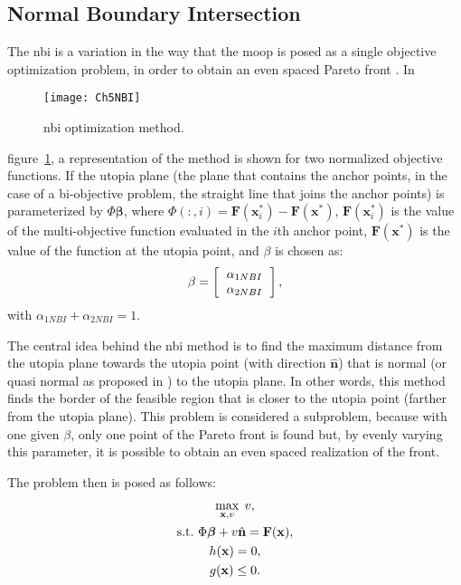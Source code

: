 \subsection{Normal Boundary Intersection}
\label{sec:NBI}
%
The \gls{nbi} is a variation in the way that the \gls{moop} is posed as a single objective optimization problem, in order to obtain an even spaced Pareto front \citep{Das1998}. In %
%
\begin{figure}[b]%
	\centering
	\texttt{[image: Ch5NBI]}%
	\caption{\gls{nbi} optimization method.}%
	\label{fig:NBI}%
\end{figure}
%
figure~\ref{fig:NBI}, a representation of the method is shown for two normalized objective functions. If the utopia plane (the plane that contains the anchor points, in the case of a bi-objective problem, the straight line that joins the anchor points) is parameterized by $\Phi\mathbf{\beta}$, where $\Phi(:,i)=\mathbf{F}(\mathbf{x}_i^*)-\mathbf{F}(\mathbf{x}^*)$, $\mathbf{F}(\mathbf{x}_i^*)$ is the value of the multi-objective function evaluated in the $i$th anchor point, $\mathbf{F}(\mathbf{x}^*)$ is the value of the function at the utopia point, and $\beta$ is chosen as:
\begin{equation}
\beta=
\left[\begin{tabular}{c}
$\alpha_{1NBI}$ \\ $\alpha_{2NBI}$
\end{tabular}\right],
\label{eq:Beta}
\end{equation}
with $\alpha_{1NBI}+\alpha_{2NBI}=1$.

The central idea behind the \gls{nbi} method is to find the maximum distance from the utopia plane towards the utopia point (with direction $\hat{\mathbf{n}}$) that is normal (or quasi normal as proposed in \citet{Das1998}) to the utopia plane. In other words, this method finds the border of the feasible region that is closer to the utopia point (farther from the utopia plane). This problem is considered a subproblem, because with one given $\beta$, only one point of the Pareto front is found but, by evenly varying this parameter, it is possible to obtain an even spaced realization of the front.

The problem then is posed as follows:%
%
\begin{equation}
\begin{gathered}
\max_{\mathbf{x},v}{\;v}, \\
\text{s.t.} \ \Phi \boldsymbol{\beta} + v \hat{\mathbf{n}} = \mathbf{F}(\mathbf{x}),\\
h(\mathbf{x})=0, \\
g(\mathbf{x}) \leq 0.
\end{gathered}
\label{eq:NBIProblem}
\end{equation}%

